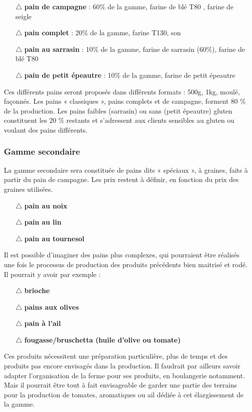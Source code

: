 \documentclass{book}
\begin{document}
\begin{itemize}

	\item[$\triangle$] \textbf{pain de campagne} : 60\% de la gamme, farine de blé T80 , farine de seigle
	\item[$\triangle$] \textbf{pain complet} : 20\% de la gamme, farine T130, son
	\item[$\triangle$] \textbf{pain au sarrasin} : 10\% de la gamme, farine de sarrasin (60\%), farine de blé T80
	\item[$\triangle$] \textbf{pain de petit épeautre} : 10\% de la gamme, farine de petit épeautre

\end{itemize}

Ces différents pains seront proposés dans différents formats : 500g, 1kg, moulé, façonnés. Les pains « classiques », pains complets et de campagne, forment 80 \% de la production. Les pains faibles (sarrasin) ou sans (petit épeautre) gluten constituent les 20 \% restants et s’adressent aux clients sensibles au gluten ou voulant des pains différents. 

\subsubsection{Gamme secondaire}

La gamme secondaire sera constituée de pains dits « spéciaux », à graines, faits à partir du pain de campagne. Les prix restent à définir, en fonction du prix des graines utilisées. 
\begin{itemize}

	\item[$\triangle$] \textbf{pain au noix}
	\item[$\triangle$] \textbf{pain au lin}
	\item[$\triangle$] \textbf{pain au tournesol}

\end{itemize}
      
Il est possible d’imaginer des pains plus complexes, qui pourraient être réalisés une fois le processus de production des produits précédents bien maitrisé et rodé. Il pourrait y avoir par exemple :
\begin{itemize}

	\item[$\triangle$] \textbf{brioche}
	\item[$\triangle$] \textbf{pains aux olives}
	\item[$\triangle$] \textbf{pain à l’ail}
	\item[$\triangle$] \textbf{fougasse/bruschetta (huile d’olive ou tomate)}

\end{itemize}
Ces produits nécessitent une préparation particulière, plus de temps et des produits pas encore envisagés dans la production. Il faudrait par ailleurs savoir adapter l’organisation de la ferme pour ses produits, en boulangerie notamment. Mais il pourrait être tout à fait envisageable de garder une partie des terrains pour la production de tomates, aromatiques ou ail dédiée à cet élargissement de la gamme.
\end{document}
